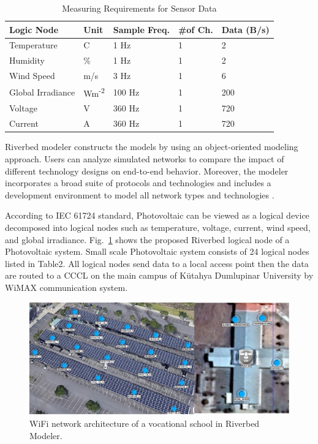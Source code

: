 \documentclass[conference, letterpaper]{IEEEtran}
\begin{document}
\begin{table}[htbp]
\caption{Measuring Requirements for Sensor Data{\cite{b7}}}
\label{tab:table1}
\centering
\begin{tabular}{lllll}
\hline
Logic Node     & Unit & Sample Freq. & \#of Ch. & Data (B/s) \\ \hline
Temperature       & C    & 1 Hz         & 1            & 2             \\
Humidity          & \%   & 1 Hz         & 1            & 2             \\
Wind Speed        & m/s  & 3 Hz         & 1            & 6             \\
Global Irradiance & Wm\textsuperscript{-2}   & 100 Hz       & 1            & 200           \\
Voltage           & V    & 360 Hz       & 1            & 720           \\
Current           & A    & 360 Hz       & 1            & 720           \\ \hline
\end{tabular}
\end{table}


Riverbed modeler constructs the models by using an object-oriented modeling approach. Users can analyze simulated networks to compare the impact of different technology designs on end-to-end behavior. Moreover, the modeler incorporates a broad suite of protocols and technologies and includes a development environment to model all network types and technologies \cite{b9}.


According to IEC 61724 standard, Photovoltaic can be viewed as a logical device decomposed into logical nodes such as temperature, voltage, current, wind speed, and global irradiance. Fig.~\ref{fig:figure3} shows the proposed Riverbed logical node of a Photovoltaic system. Small scale Photovoltaic system consists of 24 logical nodes listed in Table2. All logical nodes send data to a local access point then the data are routed to a CCCL on the main campus of Kütahya Dumlupinar University by WiMAX communication system.

\begin{figure}[htbp]
\centerline{\includegraphics[width=\columnwidth]{figure3.jpg}}
\centering
\caption{WiFi network architecture of a vocational school in Riverbed Modeler.}
\label{fig:figure3}
\end{figure}
\end{document}
